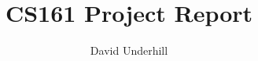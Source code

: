 \documentclass[twocolumn,10pt]{article}
\title{CS161 Project Report}
\author{David Underhill}
\begin{document}
\newcommand{\note}[1]{\textsf{\color{todocolor} #1}}
\newcommand{\dgu}[1]{\textsf{\color{dgucolor} #1}}

\newenvironment{packed_desc}{
\begin{description}
  \setlength{\topsep}{0pt}
  \setlength{\leftmargin}{0em}
  \setlength{\itemsep}{2pt plus 1pt}
  \setlength{\parskip}{0pt}
  \setlength{\parsep}{0pt}
  \vspace{-0.1in plus 0.1in}
}{\vspace{-0.1in plus 0.1in}
\end{description}
}

\maketitle



\footnotesize


\end{document}
